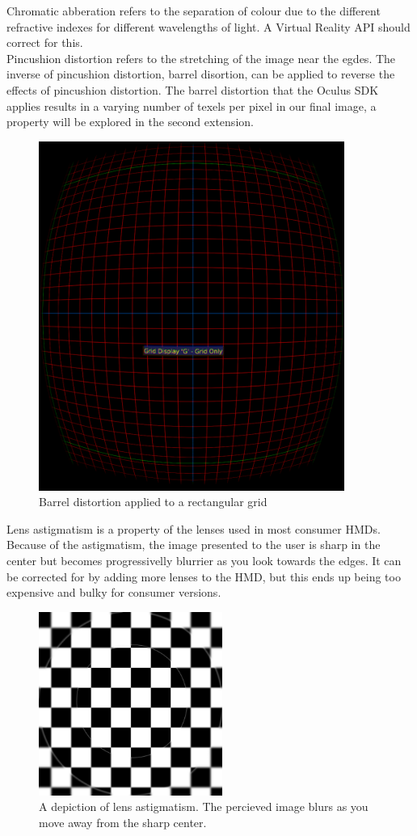 \documentclass[12pt,a4paper,twoside,openright]{report}
\begin{document}
Chromatic abberation refers to the separation of colour due to the different refractive indexes for different wavelengths of light. A Virtual Reality API should correct for this.\\

Pincushion distortion refers to the stretching of the image near the egdes. The inverse of pincushion distortion, barrel disortion, can be applied to reverse the effects of pincushion distortion. The barrel distortion that the Oculus SDK applies results in a varying number of texels per pixel in our final image, a property will be explored in the second extension.


\begin{figure}[tbh]
\centerline{\includegraphics[width=10cm]{figs/distortiongrid.png}}
\caption{Barrel distortion applied to a rectangular grid}
\label{distortiongrid}
\end{figure}

Lens astigmatism is a property of the lenses used in most consumer HMDs. Because of the astigmatism, the image presented to the user is sharp in the center but becomes progressivelly blurrier as you look towards the edges.  It can be corrected for by adding more lenses to the HMD, but this ends up being too expensive and bulky for consumer versions.

\begin{figure}
\centerline{\includegraphics[width=6cm]{figs/blur.png}}
\caption{A depiction of lens astigmatism. The percieved image blurs as you move away from the sharp center.}
\label{blurred}
\end{figure}
\end{document}
